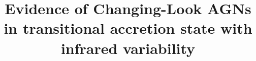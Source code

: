 \documentclass[linenumbers]{aastex631}
\begin{document}
\title{Evidence of Changing-Look AGNs in transitional accretion state with infrared variability}


\end{document}
